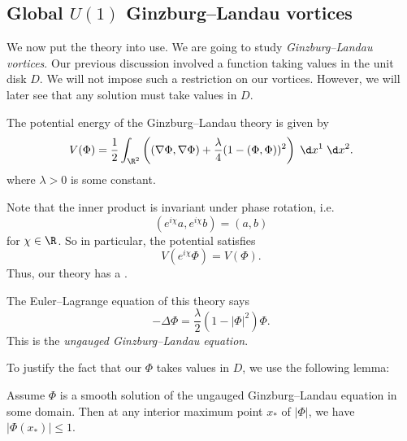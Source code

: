 \documentclass[a4paper]{article}
\begin{document}
%

\subsection{Global \texorpdfstring{$U(1)$}{U(1)} Ginzburg--Landau vortices}
We now put the theory into use. We are going to study \emph{Ginzburg--Landau vortices}. Our previous discussion involved a function taking values in the unit disk $D$. We will not impose such a restriction on our vortices. However, we will later see that any solution must take values in $D$.

The potential energy of the Ginzburg--Landau theory is given by
\[
  V(\Phi) = \frac{1}{2} \int_{\R^2} \left((\nabla \Phi, \nabla \Phi) + \frac{\lambda}{4} (1 - (\Phi, \Phi))^2 \right)\;\d x^1 \;\d x^2.
\]
where $\lambda > 0$ is some constant.

Note that the inner product is invariant under phase rotation, i.e.
\[
  (e^{i\chi} a, e^{i\chi}b) = (a, b)
\]
for $\chi \in \R$. So in particular, the potential satisfies
\[
  V(e^{i\chi}\Phi) = V(\Phi).
\]
Thus, our theory has a .

The Euler--Lagrange equation of this theory says
\[
  - \Delta \Phi = \frac{\lambda}{2}(1 - |\Phi|^2) \Phi.
\]
This is the \emph{ungauged Ginzburg--Landau equation}.

To justify the fact that our $\Phi$ takes values in $D$, we use the following lemma:
\begin{lemma}
  Assume $\Phi$ is a smooth solution of the ungauged Ginzburg--Landau equation in some domain. Then at any interior maximum point $x_*$ of $|\Phi|$, we have $|\Phi(x_*)| \leq 1$.
\end{lemma}
\end{document}
